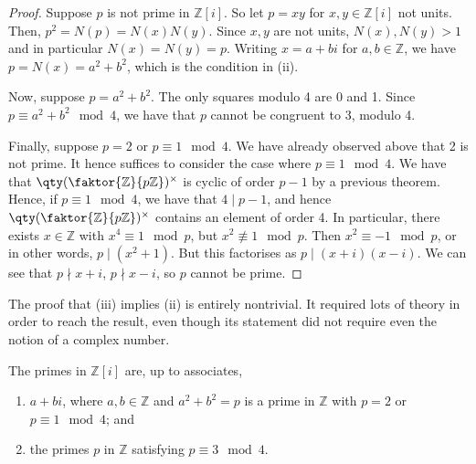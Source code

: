 \begin{proof}
	Suppose $p$ is not prime in $\mathbb Z[i]$.
	So let $p = xy$ for $x, y \in \mathbb Z[i]$ not units.
	Then, $p^2 = N(p) = N(x)N(y)$.
	Since $x, y$ are not units, $N(x), N(y) > 1$ and in particular $N(x) = N(y) = p$.
	Writing $x = a+bi$ for $a, b \in \mathbb Z$, we have $p = N(x) = a^2 + b^2$, which is the condition in (ii).

	Now, suppose $p = a^2 + b^2$.
	The only squares modulo 4 are 0 and 1.
	Since $p \equiv a^2 + b^2 \mod 4$, we have that $p$ cannot be congruent to 3, modulo 4.

	Finally, suppose $p = 2$ or $p \equiv 1 \mod 4$.
	We have already observed above that 2 is not prime.
	It hence suffices to consider the case where $p \equiv 1 \mod 4$.
	We have that $\qty(\faktor{\mathbb Z}{p\mathbb Z})^\times$ is cyclic of order $p-1$ by a previous theorem.
	Hence, if $p \equiv 1 \mod 4$, we have that $4 \mid p-1$, and hence $\qty(\faktor{\mathbb Z}{p\mathbb Z})^\times$ contains an element of order 4.
	In particular, there exists $x \in \mathbb Z$ with $x^4 \equiv 1 \mod p$, but $x^2 \not\equiv 1 \mod p$.
	Then $x^2 \equiv -1 \mod p$, or in other words, $p \mid (x^2 + 1)$.
	But this factorises as $p \mid (x+i)(x-i)$.
	We can see that $p \nmid x+i$, $p \nmid x-i$, so $p$ cannot be prime.
\end{proof}
\begin{remark}
	The proof that (iii) implies (ii) is entirely nontrivial.
	It required lots of theory in order to reach the result, even though its statement did not require even the notion of a complex number.
\end{remark}
\begin{theorem}
	The primes in $\mathbb Z[i]$ are, up to associates,
	\begin{enumerate}
		\item $a + bi$, where $a, b \in \mathbb Z$ and $a^2 + b^2 = p$ is a prime in $\mathbb Z$ with $p = 2$ or $p \equiv 1 \mod 4$; and
		\item the primes $p$ in $\mathbb Z$ satisfying $p \equiv 3 \mod 4$.
	\end{enumerate}
\end{theorem}
